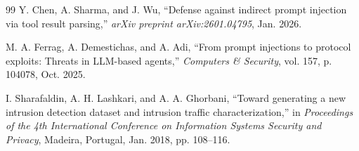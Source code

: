 \documentclass[conference]{IEEEtran}
\begin{document}
\begin{thebibliography}{99}
Y. Chen, A. Sharma, and J. Wu, ``Defense against indirect prompt injection via tool result parsing,'' \textit{arXiv preprint arXiv:2601.04795}, Jan. 2026.

M. A. Ferrag, A. Demestichas, and A. Adi, ``From prompt injections to protocol exploits: Threats in LLM-based agents,'' \textit{Computers \& Security}, vol. 157, p. 104078, Oct. 2025.

I. Sharafaldin, A. H. Lashkari, and A. A. Ghorbani, ``Toward generating a new intrusion detection dataset and intrusion traffic characterization,'' in \textit{Proceedings of the 4th International Conference on Information Systems Security and Privacy}, Madeira, Portugal, Jan. 2018, pp. 108--116.

\end{thebibliography}
\end{document}
